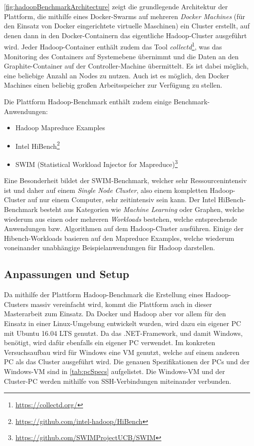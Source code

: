 \autoref{fig:hadoopBenchmarkArchitecture} zeigt die grundlegende Architektur der Plattform, die mithilfe eines Docker-Swarms auf mehreren \emph{Docker Machines} (für den Einsatz von Docker eingerichtete virtuelle Maschinen) ein Cluster erstellt, auf denen dann in den Docker-Containern das eigentliche Hadoop-Cluster ausgeführt wird. Jeder Hadoop-Container enthält zudem das Tool \emph{collectd}\footnote{\url{https://collectd.org/}}, was das Monitoring des Containers auf Systemebene übernimmt und die Daten an den Graphite-Container auf der Controller-Machine übermittelt. Es ist dabei möglich, eine beliebige Anzahl an Nodes zu nutzen. Auch ist es möglich, den Docker Machines einen beliebig großen Arbeitsspeicher zur Verfügung zu stellen.

Die Plattform Hadoop-Benchmark enthält zudem einige Benchmark-Anwendungen:

\begin{itemize}[noitemsep]
    \item Hadoop Mapreduce Examples
    \item Intel HiBench\footnote{\url{https://github.com/intel-hadoop/HiBench}}
    \item SWIM (Statistical Workload Injector for Mapreduce)\footnote{\url{https://github.com/SWIMProjectUCB/SWIM}}
\end{itemize}

Eine Besonderheit bildet der SWIM-Benchmark, welcher sehr Ressourcenintensiv ist und daher auf einem \emph{Single Node Cluster}, also einem kompletten Hadoop-Cluster auf nur einem Computer, sehr zeitintensiv sein kann. Der Intel HiBench-Benchmark besteht aus Kategorien wie \emph{Machine Learning} oder Graphen, welche wiederum aus einen oder mehreren \emph{Workloads} bestehen, welche entsprechende Anwendungen bzw. Algorithmen auf dem Hadoop-Cluster ausführen. Einige der Hibench-Workloads basieren auf den Mapreduce Examples, welche wiederum voneinander unabhängige Beispielanwendungen für Hadoop darstellen.

\subsection{Anpassungen und Setup}\label{sec:clusterFallstudie}

Da mithilfe der Plattform Hadoop-Benchmark die Erstellung eines Hadoop-Clusters massiv vereinfacht wird, kommt die Plattform auch in dieser Masterarbeit zum Einsatz. Da Docker und Hadoop aber vor allem für den Einsatz in einer Linux-Umgebung entwickelt wurden, wird dazu ein eigener PC mit Ubuntu 16.04 LTS genutzt. Da \sS das .NET-Framework, und damit Windows, benötigt, wird dafür ebenfalls ein eigener PC verwendet. Im konkreten Versuchsaufbau wird für Windows eine VM genutzt, welche auf einem anderen PC als das Cluster ausgeführt wird. Die genauen Spezifikationen der PCs und der Windows-VM sind in \autoref{tab:pcSpecs} aufgelistet. Die Windows-VM und der Cluster-PC werden mithilfe von SSH-Verbindungen miteinander verbunden.


